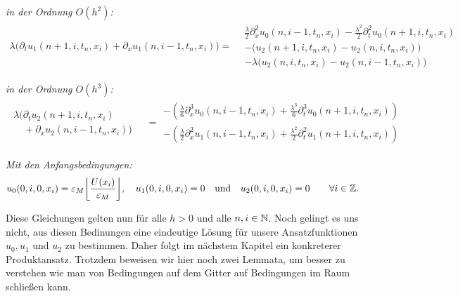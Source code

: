 \noindent \emph{in der Ordnung $O(h^2)$:}
\begin{align}\label{eq:transport:diskret:oh2}
\lambda \bigl( \partial_t u_1(n+1, i, t_n, x_i) + \partial_x u_1(n, i-1, t_n, x_i) \bigr) =
\begin{split}
&\frac {\lambda}{2} \partial^2_x u_0(n, i-1, t_n, x_i) - \frac{\lambda^2}{2} \partial^2_t u_0(n+1, i, t_n, x_i)\\
&- \bigl( u_2(n+1, i, t_n, x_i) - u_2(n, i, t_n, x_i) \bigr)\\
&- \lambda \bigl(u_2(n, i, t_n, x_i) - u_2(n, i-1, t_n, x_i) \bigr)
\end{split}
\end{align}

\noindent \emph{in der Ordnung $O(h^3)$:}
\begin{align}\label{eq:transport:diskret:oh3}
\begin{split}
\lambda \bigl(\partial_t u_2(n+1, i, t_n, x_i)\qquad\\
\quad + \partial_x u_2(n, i-1, t_n, x_i) \bigr)
\end{split}
&= \begin{split}
- \left(\frac {\lambda}{6} \partial^3_x u_0(n, i-1, t_n, x_i) + \frac{\lambda^3}{6} \partial^3_t u_0(n+1, i, t_n, x_i)\right)\\
- \left(\frac {\lambda}{2} \partial^2_x u_1(n, i-1, t_n, x_i) + \frac{\lambda^2}{2} \partial^2_t u_1(n+1, i, t_n, x_i)\right)
\end{split}
\end{align}

\vspace{0.4cm}
\noindent \emph{Mit den Anfangsbedingungen:}
\begin{align}\label{eq:transport:diskret:anfangsbedinungen}
u_0(0, i, 0, x_i) = \rd{U(x_i)}, \quad u_1(0, i, 0, x_i) = 0 \quad \text{und} \quad u_2(0, i, 0, x_i) = 0 \qquad \forall i \in \Z.
\end{align}

Diese Gleichungen gelten nun für alle $h > 0$ und alle $n, i \in \mathbb N$.
Noch gelingt es uns nicht, aus diesen Bedinungen eine eindeutige Lösung für unsere Ansatzfunktionen $u_0, u_1$ und $u_2$ zu bestimmen.
Daher folgt im nächstem Kapitel ein konkreterer Produktansatz.
Trotzdem beweisen wir hier noch zwei Lemmata, um besser zu verstehen wie man von Bedingungen auf dem Gitter auf Bedingungen im Raum schließen kann.

